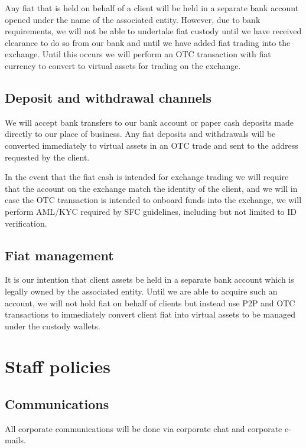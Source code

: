 {Any fiat that is held on behalf of a client will be held in a separate
bank account opened under the name of the associated entity.  However,
due to bank requirements, we will not be able to undertake fiat
custody until we have received clearance to do so from our bank and
until we have added fiat trading into the exchange.  Until this occurs
we will perform an OTC transaction with fiat currency to convert to
virtual assets for trading on the exchange.

\subsection{Deposit and withdrawal channels}

We will accept bank transfers to our bank account or paper cash
deposits made directly to our place of business.  Any fiat deposits
and withdrawals will be converted immediately to virtual assets in an
OTC trade and sent to the address requested by the client.

In the event that the fiat cash is intended for exchange trading we
will require that the account on the exchange match the identity of
the client, and we will in case the OTC transaction is intended to
onboard funds into the exchange, we will perform AML/KYC required by
SFC guidelines, including but not limited to ID verification.

\subsection{Fiat management}
It is our intention that client assets be held in a separate bank
account which is legally owned by the associated entity.  Until we are
able to acquire such an account, we will not hold fiat on behalf of
clients but instead use P2P and OTC transactions to immediately
convert client fiat into virtual assets to be managed under the
custody wallets.
}

\section{Staff policies}

\subsection{Communications}
All corporate communications will be done via corporate chat and
corporate e-mails.

